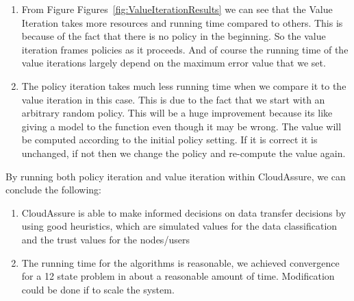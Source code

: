 \begin{enumerate}
    \item From Figure Figures~\ref{fig:ValueIterationResults} we can see that the Value Iteration takes
more resources and running time compared to others. This is because of the fact
that there is no policy in the beginning. So the value iteration frames policies
as it proceeds. And of course the running time of the value iterations largely
depend on the maximum error value that we set.
    \item The policy iteration takes much less running time when we compare it to the
value iteration in this case. This is due to the fact that we start with an
arbitrary random policy. This will be a huge improvement because its like giving
a model to the function even though it may be wrong. The value will be computed
according to the initial policy setting. If it is correct it is unchanged, if
not then we change the policy and re-compute the value again.
\end{enumerate}
By running both policy iteration and value iteration within CloudAssure, we can conclude the following:
\begin{enumerate}
    \item CloudAssure is able to make informed decisions on data transfer decisions by
using good heuristics, which are simulated values for the data
classification and the trust values for the nodes/users
    \item The running time for
the algorithms is reasonable, we achieved convergence for a 12 state problem in
about a reasonable amount of time. Modification could be done if to scale the system.
\end{enumerate}
